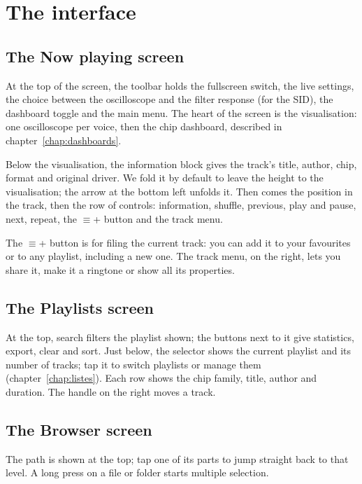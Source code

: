 \chapter{The interface}

\section{The Now playing screen}

At the top of the screen, the toolbar holds the fullscreen switch, the live settings, the choice between the
oscilloscope and the filter response (for the SID), the dashboard toggle and the main menu. The heart of the screen
is the visualisation: one oscilloscope per voice, then the chip dashboard, described in
chapter~\ref{chap:dashboards}.

Below the visualisation, the information block gives the track's title, author, chip, format and original driver.
We fold it by default to leave the height to the visualisation; the arrow at the bottom left unfolds it. Then comes
the position in the track, then the row of controls: information, shuffle, previous, play and pause, next, repeat,
the $\equiv$+ button and the track menu.

The $\equiv$+ button is for filing the current track: you can add it to your favourites or to any playlist,
including a new one. The track menu, on the right, lets you share it, make it a ringtone or show all its properties.


\section{The Playlists screen}
At the top, search filters the playlist shown; the buttons next to it give statistics, export, clear and sort. Just
below, the selector shows the current playlist and its number of tracks; tap it to switch playlists or manage them
(chapter~\ref{chap:listes}). Each row shows the chip family, title, author and duration. The handle on the right
moves a track.

\section{The Browser screen}
The path is shown at the top; tap one of its parts to jump straight back to that level. A long press on a file or
folder starts multiple selection.


